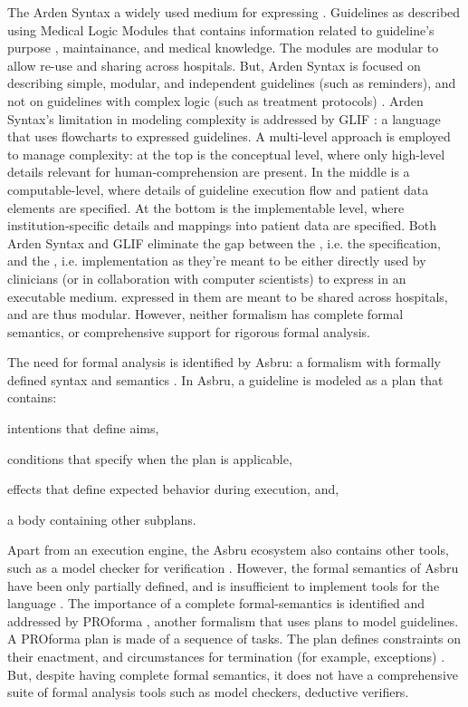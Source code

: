 The Arden Syntax \cite{HripcsakCBM94} a widely used medium for
expressing \CIGs{}.  Guidelines as described using Medical
Logic Modules that contains information related to guideline's purpose
, maintainance, and medical knowledge. The modules are modular to allow
re-use and sharing across hospitals. But, Arden Syntax
is focused on describing simple, modular, and independent
guidelines (such as reminders), and not on guidelines with complex logic (such
as treatment protocols) \cite{PelegJBI01}.
Arden Syntax's limitation in modeling complexity is addressed by
GLIF \cite{BoxwalaJBI04}: a language that uses flowcharts to expressed
guidelines. A multi-level approach is
employed to manage complexity: at the top is the conceptual level, where
only high-level details relevant for human-comprehension are present. In the
middle is a computable-level, where details of guideline execution flow
and patient data elements are specified. At the bottom is the implementable
level, where institution-specific details and mappings into patient data are
specified. Both Arden Syntax and GLIF  eliminate
the gap between the \BPG{}, i.e. the specification, and the \CIG{}, i.e. implementation as
they're meant to be either directly used by clinicians (or in collaboration with
computer scientists) to express \BPGs{} in an executable medium. \CIGs{}
expressed in them are meant to be shared across hospitals, and are thus modular.
However, neither formalism has complete formal semantics, or comprehensive support for
rigorous formal analysis.

The need for formal analysis is identified by Asbru: a formalism with formally
defined syntax and semantics \cite{ShaharAMIA96}. In Asbru, a guideline is modeled as a plan
that contains:
\begin{enumerate*}[label=(\roman*)]
  \item intentions that define aims,
  \item conditions that specify when the plan is applicable,
  \item effects that define expected behavior during execution, and,
  \item a body containing other subplans.
\end{enumerate*}
Apart from an execution engine, the Asbru ecosystem also contains
other tools, such as a model checker for verification \cite{BaumlerSPIN06}.
However, the formal semantics of Asbru have been only partially defined, and
is insufficient to implement tools for the language \cite{SuttonAMIA03}.
The importance of a complete formal-semantics is identified and addressed
by PROforma \cite{SuttonAMIA03}, another formalism that uses plans to
model guidelines. A PROforma plan is made of a sequence of tasks.
The plan defines constraints on their enactment, and circumstances
for termination (for example, exceptions) \cite{SuttonAMIA03}. But, despite
having complete formal semantics, it does not have a comprehensive suite of
formal analysis tools such as model checkers, deductive verifiers.

